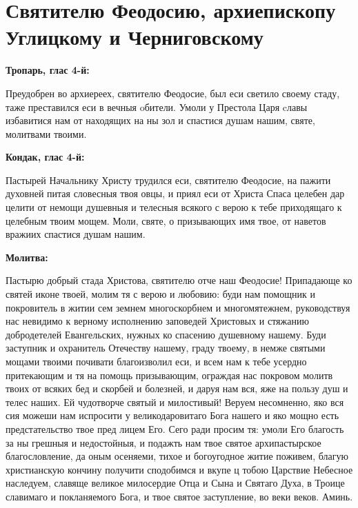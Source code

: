 \section{Святителю Феодосию, архиепископу Углицкому и  Черниговскому}
 


\bfseries Тропарь, глас 4-й:\normalfont{}


Преудобрен во архиереех, святителю Феодосие, был еси светило своему стаду, таже преставился еси в вечныя oбители. Умоли у Престола Царя cлавы избавитися нам от находящих на ны зол и спастися душам нашим, святе, молитвами твоими.


\medskip


\bfseries Кондак, глас 4-й:\normalfont{}


Пастырей Начальнику Христу трудился еси, святителю Феодосие, на пажити духовней питая словесныя твоя овцы, и приял еси от Христа Спаса целебен дар целити от немощи душевныя и телесныя всякого с верою к тебе приходящаго к целебным твоим мощем. Моли, святе, о призывающих имя твое, от наветов вражиих спастися душам нашим.


\medskip


\bfseries Молитва:\normalfont{}


Пастырю добрый стада Христова, святителю отче наш Феодосие! Припадающе ко святей иконе твоей, молим тя с верою и любовию: буди нам помощник и покровитель в житии сем земнем многоскорбнем и многомятежнем, руководствуя нас невидимо к верному исполнению заповедей Христовых и стяжанию добродетелей Евангельских, нужных ко спасению душевному нашему. Буди заступник и охранитель Отечеству нашему, граду твоему, в немже святыми мощами твоими почивати благоизволил еси, и всем нам к тебе усердно притекающим и тя на помощь призывающим, ограждая нас покровом молитв твоих от всяких бед и скорбей и болезней, и даруя нам вся, яже на пользу душ и телес наших. Ей чудотворче святый и милостивый! Веруем несомненно, яко вся сия можеши нам испросити  у великодаровитаго Бога нашего и яко мощно есть предстательство твое пред лицем Его. Сего ради просим тя: умоли Его благость за ны грешныя и недостойныя, и подажть нам твое святое архипастырское благословление, да оным осеняеми, тихое и богоугодное житие поживем, благую христианскую кончину получити сподобимся и вкупе ц тобою Царствие Небесное наследуем, славяще великое милосердие Отца и Сына и Святаго Духа, в Троице славимаго и покланяемого Бога, и твое святое заступление, во веки веков. Аминь.


